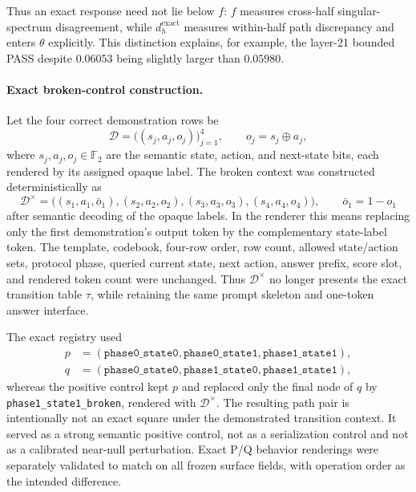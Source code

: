 \documentclass[10pt,a4paper]{article}
\begin{document}
Thus an exact response need not lie below $f$: $f$ measures cross-half singular-spectrum disagreement, while $d_h^{\mathrm{exact}}$ measures within-half path discrepancy and enters $\theta$ explicitly. This distinction explains, for example, the layer-21 bounded PASS despite $0.06053$ being slightly larger than $0.05980$.

\paragraph{Exact broken-control construction.}
Let the four correct demonstration rows be
\begin{equation}
 \mathcal D=\bigl((s_j,a_j,o_j)\bigr)_{j=1}^{4},
 \qquad o_j=s_j\oplus a_j,
\end{equation}
where $s_j,a_j,o_j\in\mathbb F_2$ are the semantic state, action, and next-state bits, each rendered by its assigned opaque label. The broken context was constructed deterministically as
\begin{equation}
 \mathcal D^{\times}=\bigl((s_1,a_1,\bar o_1),(s_2,a_2,o_2),
 (s_3,a_3,o_3),(s_4,a_4,o_4)\bigr),
 \qquad \bar o_1=1-o_1
 \label{eq:broken-context}
\end{equation}
after semantic decoding of the opaque labels. In the renderer this means replacing only the first demonstration's output token by the complementary state-label token. The template, codebook, four-row order, row count, allowed state/action sets, protocol phase, queried current state, next action, answer prefix, score slot, and rendered token count were unchanged. Thus $\mathcal D^{\times}$ no longer presents the exact transition table $\tau$, while retaining the same prompt skeleton and one-token answer interface.

The exact registry used
\begin{align}
 p&=(\texttt{phase0\_state0},\texttt{phase0\_state1},\texttt{phase1\_state1}),\\
 q&=(\texttt{phase0\_state0},\texttt{phase1\_state0},\texttt{phase1\_state1}),
\end{align}
whereas the positive control kept $p$ and replaced only the final node of $q$ by \texttt{phase1\_state1\_broken}, rendered with $\mathcal D^{\times}$. The resulting path pair is intentionally not an exact square under the demonstrated transition context. It served as a strong semantic positive control, not as a serialization control and not as a calibrated near-null perturbation. Exact P/Q behavior renderings were separately validated to match on all frozen surface fields, with operation order as the intended difference.
\end{document}

